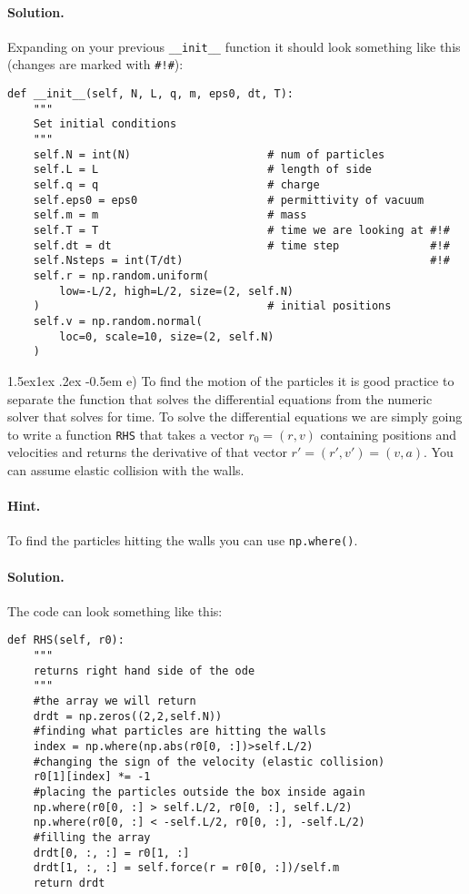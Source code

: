 \documentclass[%
oneside,                 %
final,                   %
10pt]{article}
\makeatletter
\newenvironment{doconceexercise}{}{}
\newcommand\subex{\@startsection{paragraph}{4}{\z@}%
                  {1.5ex\@plus1ex \@minus.2ex}%
                  {-0.5em}%
                  {\normalfont\normalsize\bfseries}}
\makeatother
\begin{document}
\begin{doconceexercise}
\paragraph{Solution.}
Expanding on your previous \texttt{\_\_init\_\_} function it should look something like this (changes are marked with \texttt{\#!\#}):
\begin{verbatim}
def __init__(self, N, L, q, m, eps0, dt, T):
    """
    Set initial conditions
    """
    self.N = int(N)                     # num of particles
    self.L = L                          # length of side
    self.q = q                          # charge
    self.eps0 = eps0                    # permittivity of vacuum
    self.m = m                          # mass
    self.T = T                          # time we are looking at #!#
    self.dt = dt                        # time step              #!#
    self.Nsteps = int(T/dt)                                      #!#
    self.r = np.random.uniform(
        low=-L/2, high=L/2, size=(2, self.N)
    )                                   # initial positions
    self.v = np.random.normal(
        loc=0, scale=10, size=(2, self.N)
    )
\end{verbatim}


\subex{e)}
To find the motion of the particles it is good practice to separate the function that solves the differential equations from the numeric solver that solves for time. To solve the differential equations we are simply going to write a function \texttt{RHS} that takes a vector $r_0 = (r, v)$ containing positions and velocities and returns the derivative of that vector $r' = (r', v') = (v, a)$. You can assume elastic collision with the walls.


\paragraph{Hint.}
To find the particles hitting the walls you can use \texttt{np.where()}.



\paragraph{Solution.}
The code can look something like this:
\begin{verbatim}
def RHS(self, r0):
    """
    returns right hand side of the ode
    """
    #the array we will return
    drdt = np.zeros((2,2,self.N))
    #finding what particles are hitting the walls
    index = np.where(np.abs(r0[0, :])>self.L/2)
    #changing the sign of the velocity (elastic collision)
    r0[1][index] *= -1
    #placing the particles outside the box inside again
    np.where(r0[0, :] > self.L/2, r0[0, :], self.L/2)
    np.where(r0[0, :] < -self.L/2, r0[0, :], -self.L/2)
    #filling the array
    drdt[0, :, :] = r0[1, :]
    drdt[1, :, :] = self.force(r = r0[0, :])/self.m
    return drdt
\end{verbatim}


\end{doconceexercise}
\end{document}
